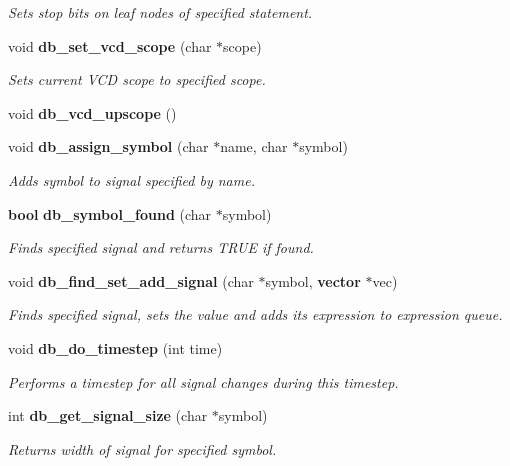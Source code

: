 \begin{CompactItemize}
\begin{CompactList}\small\item\em Sets stop bits on leaf nodes of specified statement.\item\end{CompactList}\item 
void {\bf db\_\-set\_\-vcd\_\-scope} (char $\ast$scope)
\begin{CompactList}\small\item\em Sets current VCD scope to specified scope.\item\end{CompactList}\item 
void {\bf db\_\-vcd\_\-upscope} ()
\item 
void {\bf db\_\-assign\_\-symbol} (char $\ast$name, char $\ast$symbol)
\begin{CompactList}\small\item\em Adds symbol to signal specified by name.\item\end{CompactList}\item 
{\bf bool} {\bf db\_\-symbol\_\-found} (char $\ast$symbol)
\begin{CompactList}\small\item\em Finds specified signal and returns TRUE if found.\item\end{CompactList}\item 
void {\bf db\_\-find\_\-set\_\-add\_\-signal} (char $\ast$symbol, {\bf vector} $\ast$vec)
\begin{CompactList}\small\item\em Finds specified signal, sets the value and adds its expression to expression queue.\item\end{CompactList}\item 
void {\bf db\_\-do\_\-timestep} (int time)
\begin{CompactList}\small\item\em Performs a timestep for all signal changes during this timestep.\item\end{CompactList}\item 
int {\bf db\_\-get\_\-signal\_\-size} (char $\ast$symbol)
\begin{CompactList}\small\item\em Returns width of signal for specified symbol.\item\end{CompactList}\end{CompactItemize}
